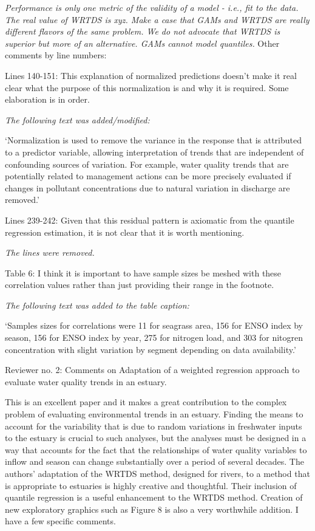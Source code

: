 \documentclass[letterpaper,12pt,oneside]{article}\usepackage[]{graphicx}\usepackage[]{color}
\begin{document}
{\it Performance is only one metric of the validity of a model - i.e., fit to the data.  The real value of WRTDS is xyz.  Make a case that GAMs and WRTDS are really different flavors of the same problem.  We do not advocate that WRTDS is superior but more of an alternative.  GAMs cannot model quantiles. }
Other comments by line numbers:

Lines 140-151:  This explanation of normalized predictions doesn't make it real clear what the purpose of this normalization is and why it is required.  Some elaboration is in order. 

{\it The following text was added/modified: 

`Normalization is used to remove the variance in the response that is attributed to a predictor variable, allowing interpretation of trends that are independent of confounding sources of variation. For example, water quality trends that are potentially related to management actions can be more precisely evaluated if changes in pollutant concentrations due to natural variation in discharge are removed.'}

Lines 239-242:  Given that this residual pattern is axiomatic from the quantile regression estimation, it is not clear that it is worth mentioning. 

{\it The lines were removed.}

Table 6:  I think it is important to have sample sizes be meshed with these correlation values rather than just providing their range in the footnote.

{\it The following text was added to the table caption:

`Samples sizes for correlations were 11 for seagrass area, 156 for ENSO index by season, 156 for ENSO index by year, 275 for nitrogen load, and 303 for nitogren concentration with slight variation by segment depending on data availability.'}
 

Reviewer no. 2: Comments on Adaptation of a weighted regression approach to evaluate water quality trends in an estuary.

This is an excellent paper and it makes a great contribution to the complex problem of evaluating environmental trends in an estuary.  Finding the means to account for the variability that is due to random variations in freshwater inputs to the estuary is crucial to such analyses, but the analyses must be designed in a way that accounts for the fact that the relationships of water quality variables to inflow and season can change substantially over a period of several decades.  The authors' adaptation of the WRTDS method, designed for rivers, to a method that is appropriate to estuaries is highly creative and thoughtful.  Their inclusion of quantile regression is a useful enhancement to the WRTDS method.  Creation of new exploratory graphics such as Figure 8 is also a very worthwhile addition.  I have a few specific comments.
\end{document}
